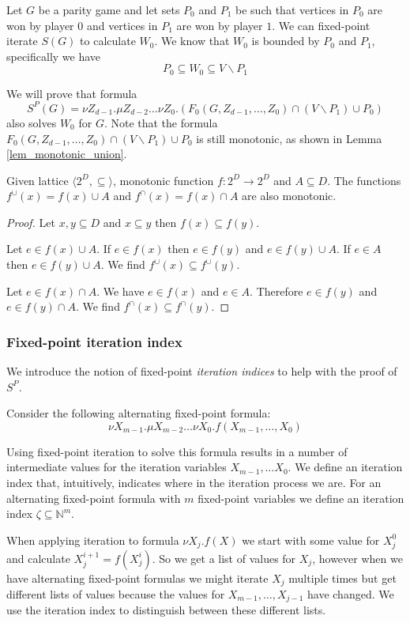 Let $G$ be a parity game and let sets $P_0$ and $P_1$ be such that vertices in $P_0$ are won by player $0$ and vertices in $P_1$ are won by player $1$. We can fixed-point iterate $S(G)$ to calculate $W_0$. We know that $W_0$ is bounded by $P_0$ and $P_1$, specifically we have
\[ P_0 \subseteq W_0 \subseteq V\backslash P_1\]

We will prove that formula 
\[ S^P(G) = \nu Z_{d-1}.\mu Z_{d-2}\dots \nu Z_0.(F_0(G,Z_{d-1},\dots,Z_0) \cap (V\backslash P_1) \cup P_0) \]
also solves $W_0$ for $G$. Note that the formula $F_0(G,Z_{d-1},\dots,Z_0) \cap (V\backslash P_1) \cup P_0$ is still monotonic, as shown in Lemma \ref{lem_monotonic_union}.
\begin{lemma}
	\label{lem_monotonic_union}
	Given lattice $\langle 2^D, \subseteq \rangle $, monotonic function $f :  2^D \rightarrow 2^D$ and $A \subseteq D$. The functions $f^\cup(x) = f(x) \cup A$ and $f^\cap(x) = f(x) \cap A$ are also monotonic.
	\begin{proof}
		Let $x,y \subseteq D$ and $x\subseteq y$ then $f(x) \subseteq f(y)$.
		
		Let $e \in f(x) \cup A$. If $e \in f(x)$ then $e \in f(y)$ and $e \in f(y) \cup A$. If $e \in A$ then $e \in f(y) \cup A$. We find $f^\cup(x) \subseteq f^\cup(y)$.
		
		Let $e \in f(x) \cap A$. We have $e \in f(x)$ and $e \in A$. Therefore $e \in f(y)$ and $e \in f(y) \cap A$. We find $f^\cap(x) \subseteq f^\cap(y)$.
	\end{proof}
\end{lemma}

\subsubsection{Fixed-point iteration index} We introduce the notion of fixed-point \textit{iteration indices} to help with the proof of $S^P$.

Consider the following alternating fixed-point formula:
\[ \nu X_{m-1}.\mu X_{m-2}\dots\nu X_0.f(X_{m-1},\dots,X_0) \]

Using fixed-point iteration to solve this formula results in a number of intermediate values for the iteration variables $X_{m-1},\dots X_0$. We define an iteration index that, intuitively, indicates where in the iteration process we are. For an alternating fixed-point formula with $m$ fixed-point variables we define an iteration index $\zeta \subseteq \mathbb{N}^m$.

When applying iteration to formula $\nu X_j.f(X)$ we start with some value for $X_j^0$ and calculate $X_j^{i+1} = f(X_j^{i})$. So we get a list of values for $X_j$, however when we have alternating fixed-point formulas we might iterate $X_j$ multiple times but get different lists of values because the values for $X_{m-1},\dots,X_{j-1}$ have changed. We use the iteration index to distinguish between these different lists. 

